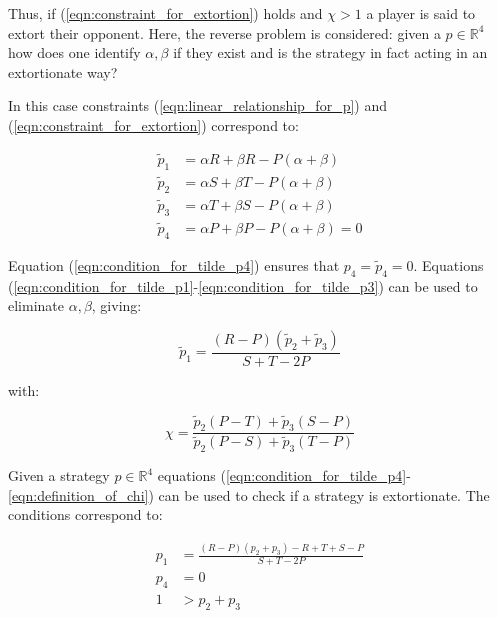 \documentclass[a4paper]{article}
\begin{document}
Thus, if (\ref{eqn:constraint_for_extortion}) holds and \(\chi >1\) a player is
said to extort their opponent.
Here, the reverse problem is considered: given a
\(p\in\mathbb{R}^4\) how does one identify \(\alpha, \beta\) if they
exist and is the strategy in fact acting in an extortionate way?

In this case constraints (\ref{eqn:linear_relationship_for_p}) and
(\ref{eqn:constraint_for_extortion}) correspond to:

\begin{align}
    \tilde p_1 & = \alpha R + \beta R - P (\alpha + \beta)
            \label{eqn:condition_for_tilde_p1}\\
    \tilde p_2 & = \alpha S + \beta T - P (\alpha + \beta)
            \label{eqn:condition_for_tilde_p2}\\
    \tilde p_3 & = \alpha T + \beta S - P (\alpha + \beta)
            \label{eqn:condition_for_tilde_p3}\\
    \tilde p_4 & = \alpha P + \beta P - P (\alpha + \beta) = 0
            \label{eqn:condition_for_tilde_p4}
\end{align}

Equation (\ref{eqn:condition_for_tilde_p4}) ensures that \(p_4=\tilde p_4=0\).
Equations (\ref{eqn:condition_for_tilde_p1}-\ref{eqn:condition_for_tilde_p3})
can be used to eliminate \(\alpha, \beta\), giving:

\begin{equation}\label{eqn:planar_definition_of_extortion}
    \tilde p_1 = \frac{(R - P)(\tilde p_2 + \tilde p_3)}{S + T - 2P}
\end{equation}

with:

\begin{equation}\label{eqn:definition_of_chi}
    \chi = \frac{\tilde p_2 (P - T) + \tilde p_3 (S - P)}
                {\tilde p_2 (P - S) + \tilde p_3 (T - P)}
\end{equation}

Given a strategy \(p\in\mathbb{R}^{4}\) equations
(\ref{eqn:condition_for_tilde_p4}-\ref{eqn:definition_of_chi}) can be used to
check if a strategy is extortionate. The conditions correspond to:

\begin{align}
    p_1 & = \frac{(R-P)(p_2 + p_3) - R + T + S - P}{S + T - 2P}
     \label{eqn:condition_for_p1}\\
    p_4 & = 0 \label{eqn:condition_for_p4}\\
    1 & > p_2 + p_3\label{eqn:condition_for_chi}
\end{align}
\end{document}
